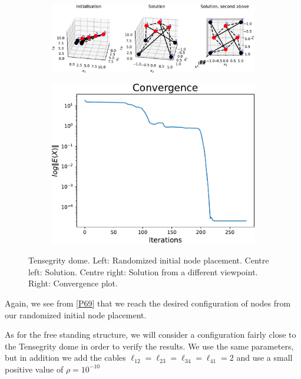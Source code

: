 \begin{figure}[!ht]
\centering
\begin{subfigure}{.72\textwidth}
  \centering
  \includegraphics[width=0.99\linewidth]{Bilder/P69.pdf}
\end{subfigure}%
\begin{subfigure}{.3\textwidth}
  \centering
  \includegraphics[width=0.99\linewidth]{Bilder/P69conv.pdf}
\end{subfigure}
\caption{Tensegrity dome. Left: Randomized initial node placement. Centre left: Solution. Centre right: Solution from a different viewpoint. Right: Convergence plot.}
\label{P69}
\end{figure}

Again, we see from \eqref{P69} that we reach the desired configuration of nodes from our randomized initial node placement. 


As for the free standing structure, we will consider a configuration fairly close to the Tensegrity dome in order to verify the results. We use the same parameters, but in addition we add the cables 
$\ell_{12} = \ell_{23} = \ell_{34} = \ell_{41} = 2 $ and use a small positive value of $\rho = 10^{-10}$

